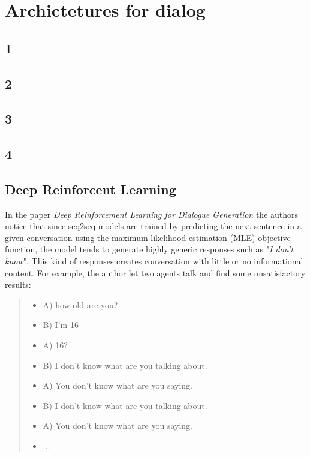\chapter{Archictetures for dialog}\label{architectures}


\section{1}

\section{2}

\section{3}

\section{4}

\section{Deep Reinforcent Learning}

In the paper \textit{Deep Reinforcement Learning for Dialogue Generation} \cite{Li:2016} the authors notice that since seq2seq models are trained by predicting the next sentence in a given conversation using the maximum-likelihood estimation (MLE) objective function, the model tends to generate  highly generic responses such as "\textit{I don't know}". This kind of responses creates conversation with little or no informational content. For example, the author let two agents talk and find some unsatisfactory results:

\begin{quote}
\begin{itemize}
\item[] A) how old are you?
\item[] B) I'm 16
\item[] A) 16?
\item[] B) I don't know what are you talking about.
\item[] A) You don't know what are you saying.
\item[] B) I don't know what are you talking about.
\item[] A) You don't know what are you saying.
\item[] $\dots$
\end{itemize}
\end{quote}


